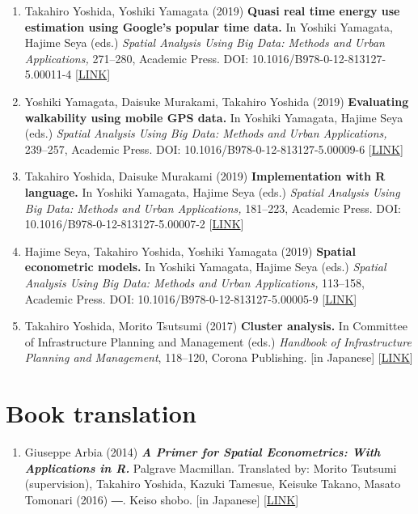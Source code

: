 \documentclass[
]{book}
\providecommand{\tightlist}{%
  \setlength{\itemsep}{0pt}\setlength{\parskip}{0pt}}
\begin{document}
\begin{enumerate}
\item
  Takahiro Yoshida, Yoshiki Yamagata (2019)
  \textbf{Quasi real time energy use estimation using Google's popular time data.}
  In Yoshiki Yamagata, Hajime Seya (eds.)
  \emph{Spatial Analysis Using Big Data: Methods and Urban Applications,} 271--280, Academic Press.
  DOI: 10.1016/B978-0-12-813127-5.00011-4 {[}\href{https://www.elsevier.com/books/spatial-analysis-using-big-data/yamagata/978-0-12-813127-5}{LINK}{]}
\item
  Yoshiki Yamagata, Daisuke Murakami, Takahiro Yoshida (2019)
  \textbf{Evaluating walkability using mobile GPS data.}
  In Yoshiki Yamagata, Hajime Seya (eds.)
  \emph{Spatial Analysis Using Big Data: Methods and Urban Applications,} 239--257, Academic Press.
  DOI: 10.1016/B978-0-12-813127-5.00009-6 {[}\href{https://www.elsevier.com/books/spatial-analysis-using-big-data/yamagata/978-0-12-813127-5}{LINK}{]}
\item
  Takahiro Yoshida, Daisuke Murakami (2019)
  \textbf{Implementation with R language.}
  In Yoshiki Yamagata, Hajime Seya (eds.)
  \emph{Spatial Analysis Using Big Data: Methods and Urban Applications,} 181--223, Academic Press.
  DOI: 10.1016/B978-0-12-813127-5.00007-2 {[}\href{https://www.elsevier.com/books/spatial-analysis-using-big-data/yamagata/978-0-12-813127-5}{LINK}{]}
\item
  Hajime Seya, Takahiro Yoshida, Yoshiki Yamagata (2019)
  \textbf{Spatial econometric models.}
  In Yoshiki Yamagata, Hajime Seya (eds.)
  \emph{Spatial Analysis Using Big Data: Methods and Urban Applications,} 113--158, Academic Press.
  DOI: 10.1016/B978-0-12-813127-5.00005-9 {[}\href{https://www.elsevier.com/books/spatial-analysis-using-big-data/yamagata/978-0-12-813127-5}{LINK}{]}
\item
  Takahiro Yoshida, Morito Tsutsumi (2017)
  \textbf{Cluster analysis.}
  In Committee of Infrastructure Planning and Management (eds.)
  \emph{Handbook of Infrastructure Planning and Management}, 118--120, Corona Publishing.
  {[}in Japanese{]} {[}\href{http://www.coronasha.co.jp/doboku-hb.html}{LINK}{]}
\end{enumerate}

\section*{Book translation}\label{book-translation}

\begin{enumerate}
\def\labelenumi{\arabic{enumi}.}
\tightlist
\item
  Giuseppe Arbia (2014)
  \textbf{\emph{A Primer for Spatial Econometrics: With Applications in R.}} Palgrave Macmillan.
  Translated by: Morito Tsutsumi (supervision), Takahiro Yoshida, Kazuki Tamesue, Keisuke Takano, Masato Tomonari (2016) ―. Keiso shobo.
  {[}in Japanese{]} {[}\href{http://www.keisoshobo.co.jp/book/b222571.html}{LINK}{]}
\end{enumerate}
\end{document}
